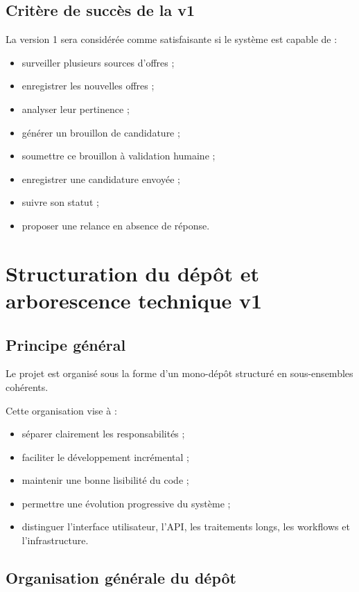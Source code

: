 \documentclass[11pt,a4paper]{article}
\begin{document}
\subsection{Critère de succès de la v1}

La version 1 sera considérée comme satisfaisante si le système est capable de :

\begin{itemize}
    \item surveiller plusieurs sources d’offres ;
    \item enregistrer les nouvelles offres ;
    \item analyser leur pertinence ;
    \item générer un brouillon de candidature ;
    \item soumettre ce brouillon à validation humaine ;
    \item enregistrer une candidature envoyée ;
    \item suivre son statut ;
    \item proposer une relance en absence de réponse.
\end{itemize}

\section{Structuration du dépôt et arborescence technique v1}

\subsection{Principe général}

Le projet est organisé sous la forme d’un mono-dépôt structuré en sous-ensembles cohérents.

Cette organisation vise à :

\begin{itemize}
    \item séparer clairement les responsabilités ;
    \item faciliter le développement incrémental ;
    \item maintenir une bonne lisibilité du code ;
    \item permettre une évolution progressive du système ;
    \item distinguer l’interface utilisateur, l’API, les traitements longs, les workflows et l’infrastructure.
\end{itemize}

\subsection{Organisation générale du dépôt}
\end{document}
